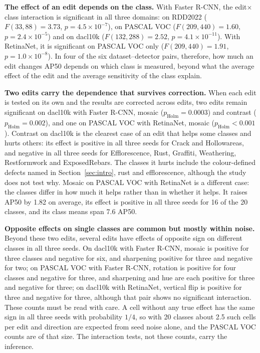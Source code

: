 \documentclass[conference]{IEEEtran}
\begin{document}
\noindent\textbf{The effect of an edit depends on the class.} With Faster R-CNN, the edit$\times$class interaction is significant in all three domains: on RDD2022 ($F(33,88)=3.73$, $p=4.5\times10^{-7}$), on PASCAL VOC ($F(209,440)=1.60$, $p=2.4\times10^{-5}$) and on dacl10k ($F(132,288)=2.52$, $p=4.1\times10^{-11}$). With RetinaNet, it is significant on PASCAL VOC only ($F(209,440)=1.91$, $p=1.0\times10^{-8}$). In four of the six dataset--detector pairs, therefore, how much an edit changes AP50 depends on which class is measured, beyond what the average effect of the edit and the average sensitivity of the class explain.

\noindent\textbf{Two edits carry the dependence that survives correction.} When each edit is tested on its own and the results are corrected across edits, two edits remain significant on dacl10k with Faster R-CNN, mosaic ($p_{\mathrm{Holm}}=0.0003$) and contrast ($p_{\mathrm{Holm}}=0.002$), and one on PASCAL VOC with RetinaNet, mosaic ($p_{\mathrm{Holm}}<0.001$). Contrast on dacl10k is the clearest case of an edit that helps some classes and hurts others: its effect is positive in all three seeds for Crack and Hollowareas, and negative in all three seeds for Efflorescence, Rust, Graffiti, Weathering, Restformwork and ExposedRebars. The classes it hurts include the colour-defined defects named in Section~\ref{sec:intro}, rust and efflorescence, although the study does not test why. Mosaic on PASCAL VOC with RetinaNet is a different case: the classes differ in how much it helps rather than in whether it helps. It raises AP50 by 1.82 on average, its effect is positive in all three seeds for 16 of the 20 classes, and its class means span 7.6 AP50.

\noindent\textbf{Opposite effects on single classes are common but mostly within noise.} Beyond these two edits, several edits have effects of opposite sign on different classes in all three seeds. On dacl10k with Faster R-CNN, mosaic is positive for three classes and negative for six, and sharpening positive for three and negative for two; on PASCAL VOC with Faster R-CNN, rotation is positive for four classes and negative for three, and sharpening and hue are each positive for three and negative for three; on dacl10k with RetinaNet, vertical flip is positive for three and negative for three, although that pair shows no significant interaction. These counts must be read with care. A cell without any true effect has the same sign in all three seeds with probability $1/4$, so with 20 classes about 2.5 such cells per edit and direction are expected from seed noise alone, and the PASCAL VOC counts are of that size. The interaction tests, not these counts, carry the inference.
\end{document}
